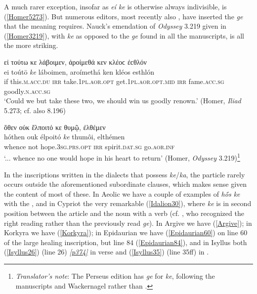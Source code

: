 A much rarer exception, insofar as \textit{eí ke} is otherwise always indivisible, is (\ref{Homer5273}). But numerous editors, most recently also \citet[112, 187]{Nauck1877}, have inserted the \textit{ge} that the meaning requires. Nauck's \citeyearpar[41]{Nauck1874} emendation of \textit{Odyssey} 3.219 given in (\ref{Homer3219}), with \textit{ke} as opposed to the \textit{ge} found in all the manuscripts, is all the more striking.

\begin{exe}
\ex εἰ τούτω κε λάβοιμεν, ἀροίμεθά κεν κλέοϲ ἐϲθλόν\\
\gll ei toútō \emph{ke} láboimen, aroímethá ken kléos esthlón\\
if this.\textsc{m.acc.du} \textsc{irr} take.\textsc{1pl.aor.opt}
get.\textsc{1pl.aor.opt.mid} \textsc{irr} fame.\textsc{acc.sg} goodly.\textsc{n.acc.sg}\\
\trans `Could we but take these two, we should win us goodly renown.' (Homer, \textit{Iliad} 5.273; cf. also 8.196)
\label{Homer5273}
\end{exe}

\begin{exe}
\ex ὅθεν οὐκ ἔλποιτό κε θυμῷ, ἐλθέμεν\\
\gll hóthen ouk élpoitó \emph{ke} thumôi, elthémen\\
whence not hope.\textsc{3sg.prs.opt} \textsc{irr} spirit.\textsc{dat.sg} go.\textsc{aor.inf}\\
\trans `... whence no one would hope in his heart to return' (Homer, \textit{Odyssey} 3.219)\footnote{\emph{Translator's note}: The Perseus edition has \textit{ge} for \textit{ke}, following the manuscripts and Wackernagel rather than \citet{Nauck1874}.}
\label{Homer3219}
\end{exe}

In the inscriptions written in the dialects that possess \textit{ke}/\textit{ka}, the particle rarely occurs outside the aforementioned  subordinate clauses, which makes sense given the content of most of these. In Aeolic we have a couple of examples of \textit{hṓs ke} with the , and in Cypriot the very remarkable (\ref{Idalion30}), where \textit{ke} is in second position between the article and the noun with a  verb (cf. \citet[70, 73]{Hoffmann1891}, who recognized the right reading rather than the previously read \textit{ge}). In Argive we have (\ref{Argive}); in Korkyra we have (\ref{Korkyra}); in Epidaurian we have (\ref{Epidaurian60}) on line 60 of the large healing inscription, but line 84 (\ref{Epidaurian84}), and in Isyllus both (\ref{Isyllus26}) (line 26) \hyperlink{p374}{\emph{[p374]}} in verse and (\ref{Isyllus35}) (line 35ff) in .

